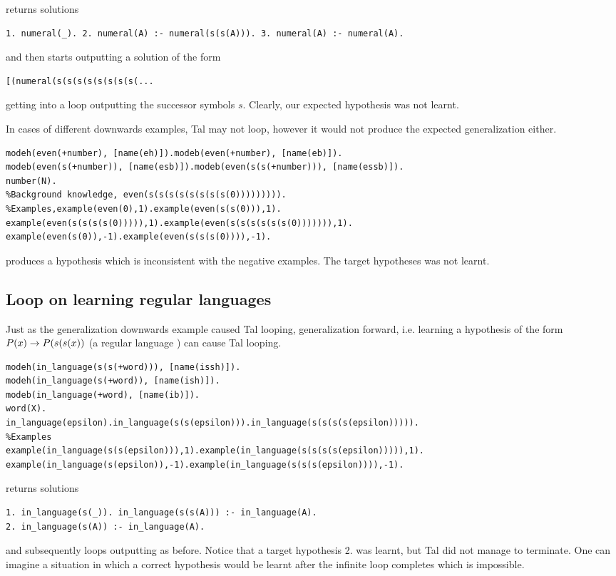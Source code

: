 returns solutions
\begin{lstlisting}
1. numeral(_). 2. numeral(A) :- numeral(s(s(A))). 3. numeral(A) :- numeral(A).
\end{lstlisting}
and then starts outputting a solution of the form
\begin{lstlisting}
[(numeral(s(s(s(s(s(s(s(s(...
\end{lstlisting}
getting into a loop outputting the successor symbols $s$. Clearly, our expected hypothesis  was not learnt.

In cases of different downwards examples, Tal may not loop, however it would not produce the expected generalization either.

\begin{lstlisting}
modeh(even(+number), [name(eh)]).modeb(even(+number), [name(eb)]).
modeb(even(s(+number)), [name(esb)]).modeb(even(s(s(+number))), [name(essb)]).
number(N).
%Background knowledge, even(s(s(s(s(s(s(s(s(0))))))))).
%Examples,example(even(0),1).example(even(s(s(0))),1).
example(even(s(s(s(s(0))))),1).example(even(s(s(s(s(s(s(0))))))),1).
example(even(s(0)),-1).example(even(s(s(s(0)))),-1).
\end{lstlisting}
produces a hypothesis  which is inconsistent with the negative examples. The target hypotheses  was not learnt.

\subsection{Loop on learning regular languages}
Just as the generalization downwards example caused Tal looping, generalization forward, i.e. learning a hypothesis of the form $P(x) \to P(s(s(x))$ (a regular language ) can cause Tal looping.
\begin{lstlisting}
modeh(in_language(s(s(+word))), [name(issh)]).
modeh(in_language(s(+word)), [name(ish)]).
modeb(in_language(+word), [name(ib)]).
word(X).
in_language(epsilon).in_language(s(s(epsilon))).in_language(s(s(s(s(epsilon))))).
%Examples
example(in_language(s(s(epsilon))),1).example(in_language(s(s(s(s(epsilon))))),1).
example(in_language(s(epsilon)),-1).example(in_language(s(s(s(epsilon)))),-1).
\end{lstlisting}
returns solutions
\begin{lstlisting}
1. in_language(s(_)). in_language(s(s(A))) :- in_language(A).
2. in_language(s(A)) :- in_language(A).
\end{lstlisting}
and subsequently loops outputting \tc{[(in\_language(s(s(s(s...} as before.
Notice that a target hypothesis 2. was learnt, but Tal did not manage to terminate. One can imagine a situation in which a correct hypothesis would be learnt after the infinite loop completes which is impossible.

